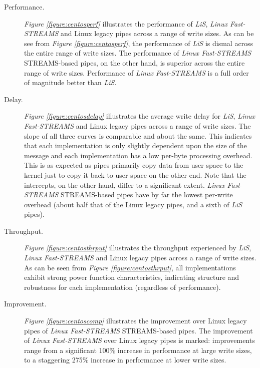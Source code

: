 \documentclass[letterpaper,final,notitlepage,twocolumn,10pt,twoside]{article}
\begin{document}
\begin{description}

\item[Performance.]

\textit{Figure \ref{figure:centosperf}} illustrates the performance of
\textsl{LiS}, \textsl{Linux Fast-STREAMS} and Linux legacy pipes across a
range of write sizes.  As can be see from \textit{Figure
\ref{figure:centosperf}}, the performance of \textsl{LiS} is dismal across the
entire range of write sizes.  The performance of \textsl{Linux Fast-STREAMS}
STREAMS-based pipes, on the other hand, is superior across the entire range of
write sizes.
Performance of \textsl{Linux Fast-STREAMS} is a full order of magnitude better
than \textsl{LiS}.

\item[Delay.]

\textit{Figure \ref{figure:centosdelay}} illustrates the average write delay
for \textsl{LiS}, \textsl{Linux Fast-STREAMS} and Linux legacy pipes across a
range of write sizes.  The slope of all three curves is comparable and about
the same.  This indicates that each implementation is only slightly dependent
upon the size of the message and each implementation has a low per-byte
processing overhead.  This is as expected as pipes primarily copy data from
user space to the kernel just to copy it back to user space on the other end.
Note that the intercepts, on the other hand, differ to a significant extent.
\textsl{Linux Fast-STREAMS} STREAMS-based pipes have by far the lowest
per-write overhead (about half that of the Linux legacy pipes, and a sixth of
\textsl{LiS} pipes).

\item[Throughput.]

\textit{Figure \ref{figure:centosthrput}} illustrates the throughput
experienced by \textsl{LiS}, \textsl{Linux Fast-STREAMS} and Linux legacy
pipes across a range of write sizes.  As can be seen from \textit{Figure
\ref{figure:centosthrput}}, all implementations exhibit strong power function
characteristics, indicating structure and robustness for each implementation
(regardless of performance).

\item[Improvement.]

\textit{Figure \ref{figure:centoscomp}} illustrates the improvement over Linux
legacy pipes of \textsl{Linux Fast-STREAMS} STREAMS-based pipes.  The
improvement of \textsl{Linux Fast-STREAMS} over Linux legacy pipes is marked:
improvements range from a significant 100\% increase in performance at large
write sizes, to a staggering 275\% increase in performance at lower write
sizes.

\end{description}
\end{document}
